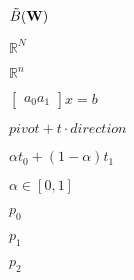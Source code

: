\documentclass{article}
\begin{document}
$\tilde{B}({\bf W})$
\pagebreak

$\mathbb{R}^N$
\pagebreak

$\mathbb{R}^n$
\pagebreak

$\left[\begin{array}{c}{a_0}{a_1}\end{array}\right]x=b$
\pagebreak

$pivot+t\cdot{}direction$
\pagebreak

$\alpha{}t_0+(1-\alpha)t_1$
\pagebreak

$\alpha\in[0,1]$
\pagebreak

$p_0$
\pagebreak

$p_1$
\pagebreak

$p_2$
\pagebreak
\end{document}
